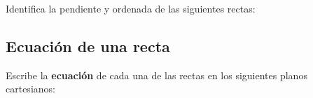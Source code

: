 \documentclass[12pt,addpoints,answers]{evalua}
\begin{document}
\begin{questions}
     
      \question[8] Identifica la pendiente y ordenada de las siguientes rectas:
    
      \begin{multicols}{2}
      \end{multicols}


      
	\subsection{Ecuación de una recta}

    
      \question[4] Escribe la \textbf{ecuación} de cada una de las rectas en los siguientes planos cartesianos:
    
      \begin{multicols}{2}
            \begin{parts}

\end{parts}
\end{multicols}
\end{questions}
\end{document}
